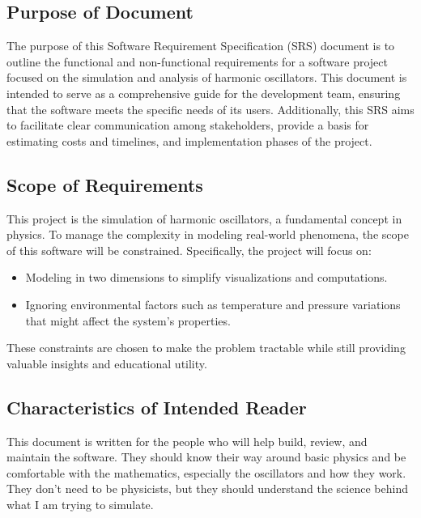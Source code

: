 \documentclass[12pt]{article}
\begin{document}
\subsection{Purpose of Document}

The purpose of this Software Requirement Specification (SRS) document 
is to outline the functional and non-functional requirements for a 
software project focused on the simulation and analysis of harmonic 
oscillators. This document is intended to serve as a comprehensive 
guide for the development team, ensuring that the software meets the 
specific needs of its users. Additionally, this SRS aims to facilitate 
clear communication among stakeholders, provide a basis for estimating 
costs and timelines, and implementation phases of the project.

\subsection{Scope of Requirements} 

This project is the simulation of harmonic oscillators, a fundamental 
concept in physics. To manage the complexity in modeling real-world 
phenomena, the scope of this software will be constrained. Specifically, 
the project will focus on:

\begin{itemize}
  \item Modeling in two dimensions to simplify visualizations and 
  computations.
  \item Ignoring environmental factors such as temperature and pressure 
  variations that might affect the system's properties.
\end{itemize}

These constraints are chosen to make the problem tractable while still 
providing valuable insights and educational utility.

\subsection{Characteristics of Intended Reader} \label{sec_IntendedReader}

This document is written for the people who will help build, review, 
and maintain the software. They should know their way around basic 
physics and be comfortable with the mathematics, especially the 
oscillators and how they work. They don't need to be physicists, but 
they should understand the science behind what I am trying to simulate.
\end{document}
